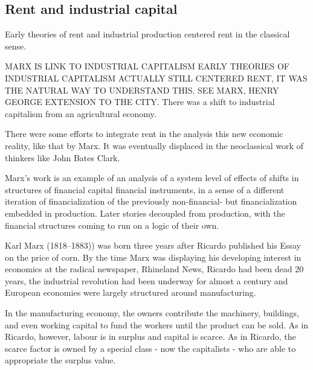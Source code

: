 \subsection{Rent and industrial capital}

Early theories of rent and industrial production centered rent in the classical sense.

MARX IS LINK TO INDUSTRIAL CAPITALISM
EARLY THEORIES OF INDUSTRIAL CAPITALISM ACTUALLY STILL CENTERED RENT, IT WAS THE NATURAL WAY TO UNDERSTAND THIS. SEE MARX, HENRY GEORGE EXTENSION TO THE CITY.
There was a shift to industrial capitalism from an agricultural economy.

There were some efforts to integrate rent in the analysis this new economic reality, like that by Marx. 
It was eventually displaced in the neoclassical work of thinkers like John Bates Clark.

Marx's work is an example of an analysis of a system level of effects of shifts in structures of financial capital financial instruments, in a sense of a different iteration of financialization of the previously non-financial- but financialization embedded in production. Later stories decoupled from production, with the financial structures coming to run on a logic of their own.

Karl Marx (1818--1883)) was born three years after Ricardo published his Essay on the price of corn. 
By the time Marx was displaying  his developing interest in economics  at the radical newspaper, Rhineland News, Ricardo had been dead 20 years, the industrial revolution had been underway for almost a century and European economies were largely structured around manufacturing. 

 In the manufacturing economy, the owners contribute the machinery, buildings, and even working capital to fund the workers until the product can be sold. %
As in Ricardo, however, labour is in surplus and capital is scarce. As in Ricardo, the scarce factor is owned by a special class - now the capitalists - who are able to appropriate the surplus value. %

